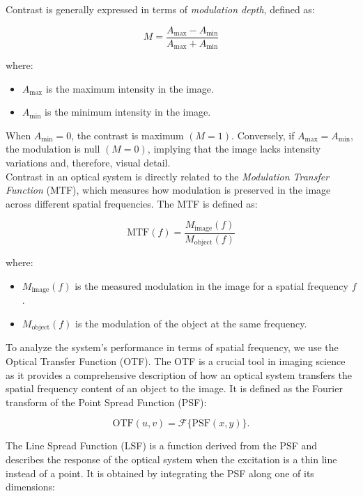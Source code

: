 \noindent Contrast is generally expressed in terms of \textit{modulation depth}, defined as:

\begin{equation}
M = \frac{A_{\max} - A_{\min}}{A_{\max} + A_{\min}}
\label{eq:contraste}
\end{equation}

where:
\begin{itemize}
    \item $A_{\max}$ is the maximum intensity in the image.
    \item $A_{\min}$ is the minimum intensity in the image.
\end{itemize}

When $A_{\min} = 0$, the contrast is maximum $(M = 1)$. Conversely, if $A_{\max} = A_{\min}$, the modulation is null $(M = 0)$, implying that the image lacks intensity variations and, therefore, visual detail.\\

\noindent Contrast in an optical system is directly related to the \textit{Modulation Transfer Function} (MTF), which measures how modulation is preserved in the image across different spatial frequencies. The MTF is defined as:

\begin{equation}
\text{MTF}(f) = \frac{M_{\text{image}}(f)}{M_{\text{object}}(f)}
\label{mtf}
\end{equation}

where:
\begin{itemize}
    \item $M_{\text{image}}(f)$ is the measured modulation in the image for a spatial frequency $f$.
    \item $M_{\text{object}}(f)$ is the modulation of the object at the same frequency.
\end{itemize}

\noindent To analyze the system's performance in terms of spatial frequency, we use the Optical Transfer Function (OTF). The OTF is a crucial tool in imaging science as it provides a comprehensive description of how an optical system transfers the spatial frequency content of an object to the image. It is defined as the Fourier transform of the Point Spread Function (PSF):

\begin{equation}
\text{OTF}(u,v) = \mathcal{F} \{ \text{PSF}(x,y) \}.
\end{equation}


\noindent The Line Spread Function (LSF) is a function derived from the PSF and describes the response of the optical system when the excitation is a thin line instead of a point. It is obtained by integrating the PSF along one of its dimensions:

